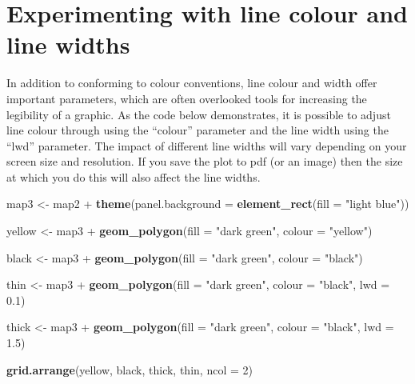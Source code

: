 \documentclass[]{article}
\newenvironment{Shaded}{}{}
\newcommand{\KeywordTok}[1]{\textcolor[rgb]{0.00,0.44,0.13}{\textbf{{#1}}}}
\newcommand{\DataTypeTok}[1]{\textcolor[rgb]{0.56,0.13,0.00}{{#1}}}
\newcommand{\DecValTok}[1]{\textcolor[rgb]{0.25,0.63,0.44}{{#1}}}
\newcommand{\FloatTok}[1]{\textcolor[rgb]{0.25,0.63,0.44}{{#1}}}
\newcommand{\StringTok}[1]{\textcolor[rgb]{0.25,0.44,0.63}{{#1}}}
\newcommand{\NormalTok}[1]{{#1}}
\begin{document}
\section{Experimenting with line colour and line widths}

In addition to conforming to colour conventions, line colour and width
offer important parameters, which are often overlooked tools for
increasing the legibility of a graphic. As the code below demonstrates,
it is possible to adjust line colour through using the ``colour''
parameter and the line width using the ``lwd'' parameter. The impact of
different line widths will vary depending on your screen size and
resolution. If you save the plot to pdf (or an image) then the size at
which you do this will also affect the line widths.

\begin{Shaded}
\begin{Highlighting}[]
\NormalTok{map3 <- map2 + }\KeywordTok{theme}\NormalTok{(}\DataTypeTok{panel.background =} \KeywordTok{element_rect}\NormalTok{(}\DataTypeTok{fill =} \StringTok{"light blue"}\NormalTok{))}

\NormalTok{yellow <- map3 + }\KeywordTok{geom_polygon}\NormalTok{(}\DataTypeTok{fill =} \StringTok{"dark green"}\NormalTok{, }\DataTypeTok{colour =} \StringTok{"yellow"}\NormalTok{)}

\NormalTok{black <- map3 + }\KeywordTok{geom_polygon}\NormalTok{(}\DataTypeTok{fill =} \StringTok{"dark green"}\NormalTok{, }\DataTypeTok{colour =} \StringTok{"black"}\NormalTok{)}

\NormalTok{thin <- map3 + }\KeywordTok{geom_polygon}\NormalTok{(}\DataTypeTok{fill =} \StringTok{"dark green"}\NormalTok{, }\DataTypeTok{colour =} \StringTok{"black"}\NormalTok{, }\DataTypeTok{lwd =} \FloatTok{0.1}\NormalTok{)}

\NormalTok{thick <- map3 + }\KeywordTok{geom_polygon}\NormalTok{(}\DataTypeTok{fill =} \StringTok{"dark green"}\NormalTok{, }\DataTypeTok{colour =} \StringTok{"black"}\NormalTok{, }\DataTypeTok{lwd =} \FloatTok{1.5}\NormalTok{)}

\KeywordTok{grid.arrange}\NormalTok{(yellow, black, thick, thin, }\DataTypeTok{ncol =} \DecValTok{2}\NormalTok{)}
\end{Highlighting}
\end{Shaded}
\end{document}
